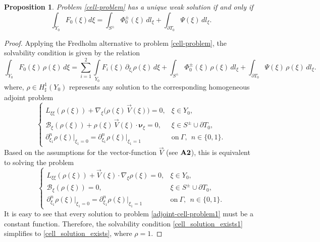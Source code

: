 \documentclass[reqno]{amsart}            %
\newtheorem{proposition}{Proposition}[section]
\numberwithin{equation}{section}
\begin{document}
	\begin{proposition}\label{Prop-4-1}
		Problem \eqref{cell-problem} has a unique weak solution if and only if
		\begin{equation}\label{cell_solution_exists}
			\int_{Y_0} F_0(\xi) d\xi =  \int_{S^{\pm}} \Phi^{\pm}_0(\xi)  \, dl_\xi + \int_{\partial T_0} \Psi(\xi)  \, dl_\xi.
		\end{equation}
	\end{proposition}
	\begin{proof}
		Applying the Fredholm alternative to problem \eqref{cell-problem}, the solvability condition is given by the relation
		\begin{equation}\label{cell_solution_exists1}
			\int_{Y_0} F_0(\xi) \, \rho(\xi) \, d\xi = \sum_{i=1}^{2} \int\limits_{Y_0} F_i(\xi)\,\partial_{\xi_i}\rho(\xi)\, d\xi + \int_{S^{\pm}} \Phi^{\pm}_0(\xi)  \, \rho(\xi) \, dl_\xi + \int_{\partial T_0} \Psi(\xi)  \, \rho(\xi) \, dl_\xi.
		\end{equation}
		where,  $\rho \in H^1_\sharp(Y_0)$ represents any solution to the corresponding homogeneous adjoint problem
		\begin{equation}\label{adjoint-cell-problem2}
			\left\{
			\begin{array}{ll}
				L_{\xi\xi}(\rho(\xi))  + \nabla_{\xi}\big(\rho(\xi)\, \overrightarrow{V}(\xi)\big) = 0, &
				\xi\in Y_0,
				\\[3pt]
				\mathcal{B}_{\xi}(\rho(\xi))  + \rho(\xi)\, \overrightarrow{V}(\xi) \cdot \boldsymbol{\nu}_\xi = 0,
				&  \xi \in S^{\pm} \cup  \partial T_0,
				\\[3pt]
				\partial^n_{\xi_1}\rho(\xi)\big|_{\xi_1=0} = \partial^n_{\xi_1}\rho(\xi)\big|_{\xi_1=1} & \text{on} \ \Gamma, \ \ n\in\{0, 1\}.
			\end{array}
			\right.
		\end{equation}
		Based on the assumptions for the vector-function $\overrightarrow{V}$ (see $\bf{A2}$), this  is equivalent to solving the problem
		\begin{equation}\label{adjoint-cell-problem1}
			\left\{
			\begin{array}{ll}
				L_{\xi\xi}(\rho(\xi))  + \overrightarrow{V}(\xi) \cdot \nabla_{\xi}\rho(\xi) = 0, &
				\xi\in Y_0,
				\\[3pt]
				\mathcal{B}_{\xi}(\rho(\xi)) = 0,
				&  \xi \in S^{\pm} \cup  \partial T_0,
				\\[3pt]
				\partial^n_{\xi_1}\rho(\xi)\big|_{\xi_1=0} = \partial^n_{\xi_1}\rho(\xi)\big|_{\xi_1=1} & \text{on} \ \Gamma, \ \ n\in\{0, 1\}.
			\end{array}
			\right.
		\end{equation}
		It is easy to see that every solution to problem \eqref{adjoint-cell-problem1} must be a constant function. Therefore, the solvability condition \eqref{cell_solution_exists1} simplifies to \eqref{cell_solution_exists}, where $\rho =1.$
	\end{proof}
	
\end{document}
